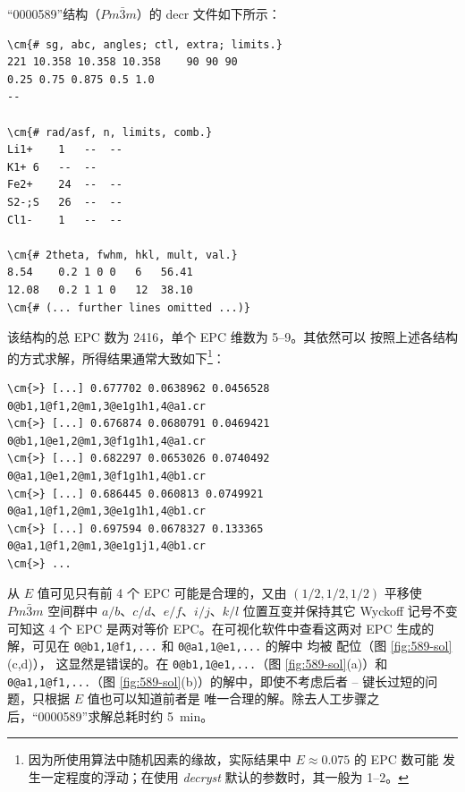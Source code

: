“0000589”结构（$Pm\bar3m$）的 decr 文件如下所示：
\begin{Verbatim}
\cm{# sg, abc, angles; ctl, extra; limits.}
221	10.358 10.358 10.358	90 90 90
0.25 0.75 0.875	0.5 1.0
--

\cm{# rad/asf, n, limits, comb.}
Li1+	1	--	--
K1+	6	--	--
Fe2+	24	--	--
S2-;S	26	--	--
Cl1-	1	--	--

\cm{# 2theta, fwhm, hkl, mult, val.}
8.54	0.2	1 0 0	6	56.41
12.08	0.2	1 1 0	12	38.10
\cm{# (... further lines omitted ...)}
\end{Verbatim}
该结构的总 EPC 数为 2416，单个 EPC 维数为 5--9。其依然可以
按照上述各结构的方式求解，所得结果通常大致如下\footnote{%
	因为所使用算法中随机因素的缘故，实际结果中 $E \approx 0.075$ 的 EPC 数可能
	发生一定程度的浮动；在使用 \emph{decryst} 默认的参数时，其一般为 1--2。%
}：
\begin{Verbatim}
\cm{>} [...] 0.677702 0.0638962 0.0456528	0@b1,1@f1,2@m1,3@e1g1h1,4@a1.cr
\cm{>} [...] 0.676874 0.0680791 0.0469421	0@b1,1@e1,2@m1,3@f1g1h1,4@a1.cr
\cm{>} [...] 0.682297 0.0653026 0.0740492	0@a1,1@e1,2@m1,3@f1g1h1,4@b1.cr
\cm{>} [...] 0.686445 0.060813 0.0749921	0@a1,1@f1,2@m1,3@e1g1h1,4@b1.cr
\cm{>} [...] 0.697594 0.0678327 0.133365	0@a1,1@f1,2@m1,3@e1g1j1,4@b1.cr
\cm{>} ...
\end{Verbatim}
从 $E$ 值可见只有前 4 个 EPC 可能是合理的，又由 $(1/2, 1/2, 1/2)$ 平移使
$Pm\bar3m$ 空间群中 $a/b$、$c/d$、$e/f$、$i/j$、$k/l$ 位置互变并保持其它
Wyckoff 记号不变可知这 4 个 EPC 是两对等价 EPC。在可视化软件中查看这两对
EPC 生成的解，可见在 \verb|0@b1,1@f1,...| 和 \verb|0@a1,1@e1,...|
的解中  均被  配位（图 \ref{fig:589-sol}(c,d)），
这显然是错误的。在 \verb|0@b1,1@e1,...|（图 \ref{fig:589-sol}(a)）和
\verb|0@a1,1@f1,...|（图 \ref{fig:589-sol}(b)）的解中，即使不考虑后者
-- 键长过短的问题，只根据 $E$ 值也可以知道前者是
唯一合理的解。除去人工步骤之后，“0000589”求解总耗时约 \SI{5}{\minute}。

